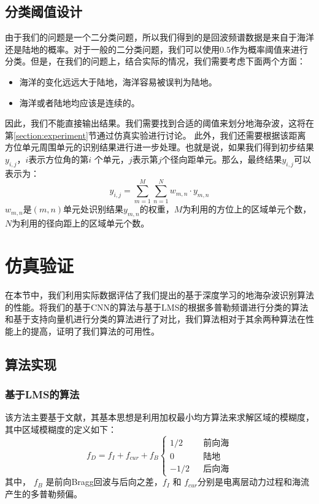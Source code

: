 \subsection{分类阈值设计}
由于我们的问题是一个二分类问题，所以我们得到的是回波频谱数据是来自于海洋还是陆地的概率。对于一般的二分类问题，我们可以使用$ 0.5 $作为概率阈值来进行分类。但是，在我们的问题上，结合实际的情况，我们需要考虑下面两个方面：
\begin{itemize}
	\item 海洋的变化远远大于陆地，海洋容易被误判为陆地。
	\item 海洋或者陆地均应该是连续的。
\end{itemize}
因此，我们不能直接输出结果。我们需要找到合适的阈值来划分地海杂波，这将在第\ref{section:experiment}节通过仿真实验进行讨论。
此外，我们还需要根据该距离方位单元周围单元的识别结果进行进一步处理。也就是说，如果我们得到初步结果$y_{i,j}$，$i$表示方位角的第$ i $ 个单元，$ j $表示第$ j $个径向距单元。那么，最终结果$y_{i, j}$可以表示为：
\begin{equation}
y_{i, j} = \sum_{m=1}^{M}\sum_{n=1}^{N}w_{m,n}\cdot y_{m,n}
\end{equation}
$ w_{m,n} $是$(m,n)$单元处识别结果$y_{m,n}$的权重，$M$为利用的方位上的区域单元个数，$N$为利用的径向距上的区域单元个数。
\section{仿真验证}
在本节中，我们利用实际数据评估了我们提出的基于深度学习的地海杂波识别算法的性能。将我们的基于CNN的算法与基于LMS\cite{turley2013high}的根据多普勒频谱进行分类的算法和基于支持向量机进行分类的算法\cite{jin2012svm}进行了对比，我们算法相对于其余两种算法在性能上的提高，证明了我们算法的可用性。
\subsection{算法实现}
\subsubsection{基于LMS的算法}
该方法主要基于文献\cite{turley2013high}，其基本思想是利用加权最小均方算法来求解区域的模糊度，其中区域模糊度的定义如下：
\begin{equation}
	f_D = f_I + f_{cur} + f_B\left\{
		\begin{array}{rcl}
		1/2       &      & \text{前向海}\\
		0     &      & \text{陆地}\\
		-1/2       &      & \text{后向海}
		\end{array} \right.
\end{equation}
其中， $f_B$ 是前向Bragg回波与后向之差，$f_I$ 和 $f_{cur}$分别是电离层动力过程和海流产生的多普勒频偏。


